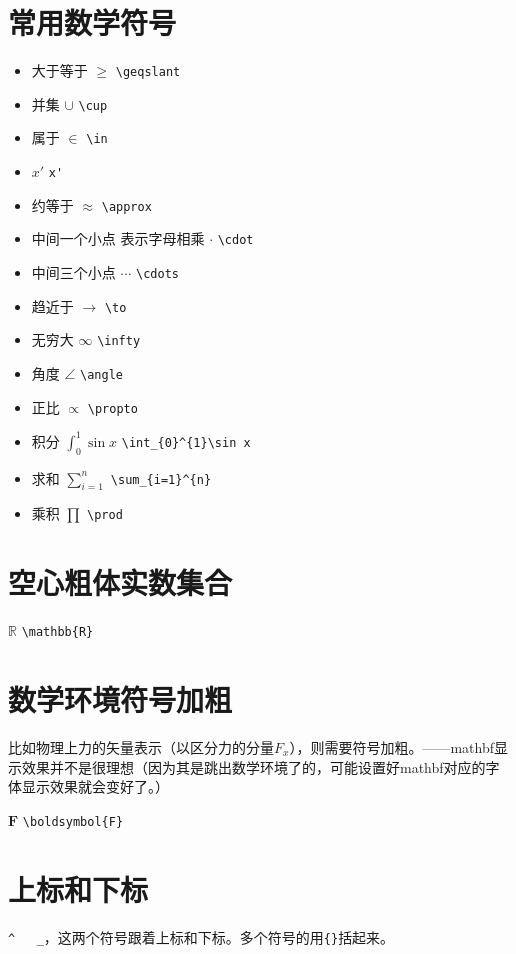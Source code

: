 \documentclass[11pt,oneside]{book}
\begin{document}
      \section{常用数学符号}
      \begin{itemize}
      \item  大于等于 $\geqslant$  \verb+\geqslant+
      \item  并集 $\cup$  \verb+\cup+
      \item 属于  $\in$  \verb+\in+
      \item  $x'$  \verb+x'+
      \item  约等于  $\approx$ \verb+\approx+
      \item 中间一个小点 表示字母相乘 $\cdot$  \verb+\cdot+
      \item 中间三个小点 $\cdots$  \verb+\cdots+
      \item  趋近于  $\to$ \verb+\to+
      \item 无穷大 $\infty$  \verb+\infty+
      \item 角度 $\angle$ \verb+\angle+
      \item  正比  $\propto$ \verb+\propto+
      \item 积分 $\int_{0}^{1}\sin x$ \verb+\int_{0}^{1}\sin x+
      \item 求和 $\sum_{i=1}^{n}$ \verb+\sum_{i=1}^{n}+
      \item 乘积 $\prod$ \verb+\prod+
      \end{itemize}


      \section{空心粗体实数集合}
      $\mathbb{R}$  \verb+\mathbb{R}+

      \section{数学环境符号加粗}
      比如物理上力的矢量表示（以区分力的分量$ F_x $），则需要符号加粗。——mathbf显示效果并不是很理想（因为其是跳出数学环境了的，可能设置好mathbf对应的字体显示效果就会变好了。）

      $ \boldsymbol{F} $    \verb+\boldsymbol{F}+

      \section{上标和下标}
      \verb+^   _+，这两个符号跟着上标和下标。多个符号的用\verb+{}+括起来。
\end{document}
